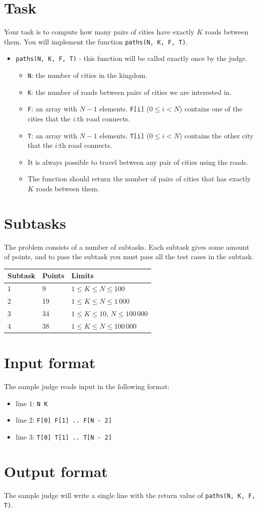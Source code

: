 \section*{Task}
Your task is to compute how many pairs of cities have exactly $K$ roads between them. You will implement the function \texttt{paths(N, K, F, T)}.
\begin{itemize}
  \item \texttt{paths(N, K, F, T)} - this function will be called exactly once by the judge.
  \begin{itemize}
    \item \texttt{N}: the number of cities in the kingdom.
    \item \texttt{K}: the number of roads between pairs of cities we are interested in.
    \item \texttt{F}: an array with $N - 1$ elements. \texttt{F[i]} ($0 \le i < N$) contains one of the cities that the $i$:th road connects.
    \item \texttt{T}: an array with $N - 1$ elements. \texttt{T[i]} ($0 \le i < N$) contains the other city that the $i$:th road connects.
    \item It is always possible to travel between any pair of cities using the roads.
    \item The function should return the number of pairs of cities that has exactly $K$ roads between them.
  \end{itemize}
\end{itemize}

\section*{Subtasks}
The problem consists of a number of subtasks. Each subtask gives some amount of points, and to pass
the subtask you must pass all the test cases in the subtask.

\begin{tabular}{|l|l|l|}
  \hline
  \textbf{Subtask} & \textbf{Points} & \textbf{Limits} \\ \hline
  1 & 9 & $1 \le K \le N \le 100$ \\ \hline
  2 & 19 & $1 \le K \le N \le 1\,000$ \\ \hline
  3 & 34 & $1 \le K \le 10$, $N \le 100\,000$ \\ \hline
  4 & 38 & $1 \le K \le N \le 100\,000$ \\ \hline
\end{tabular}

\section*{Input format}
The sample judge reads input in the following format:

\begin{itemize}
  \item line $1$: \texttt{N K}
  \item line $2$: \texttt{F[0] F[1] .. F[N - 2]}
  \item line $3$: \texttt{T[0] T[1] .. T[N - 2]}
\end{itemize}

\section*{Output format}
The sample judge will write a single line with the return value of \texttt{paths(N, K, F, T)}.
